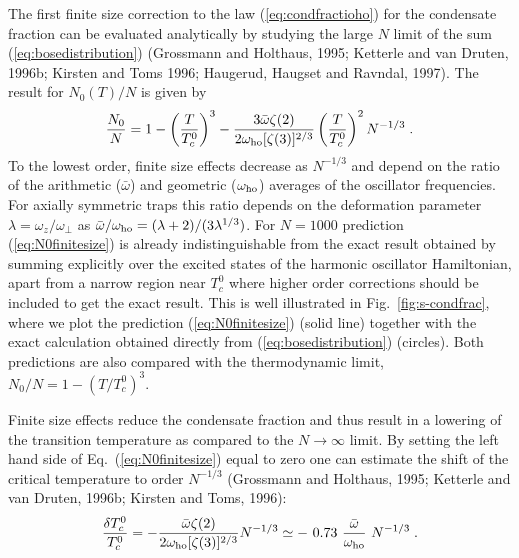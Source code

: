 The first finite size correction to the law (\ref{eq:condfractioho}) for
the condensate fraction can be evaluated analytically by studying the large
$N$ limit of the sum (\ref{eq:bosedistribution}) (Grossmann and Holthaus, 
1995; Ketterle and van Druten, 1996b; Kirsten and Toms 1996; Haugerud, 
Haugset and Ravndal, 1997). The result for $N_0(T)/N$ is given by
\begin{equation}
{ N_0 \over N } = 1 - \left( {T \over T_c^0} \right)^3
- { 3 \bar{\omega} \zeta(2) \over 2 \omega_{\rm ho}
[\zeta(3)]^{2/3} } \left( {T \over T_c^0} \right)^2 
N^{-1/3}  \;.
\label{eq:N0finitesize}
\end{equation}
To the lowest order, finite size effects decrease as $N^{-1/3}$ 
and depend on the ratio of the arithmetic ($\bar{\omega}$) and
geometric ($\omega_{\rm ho}$) averages of the oscillator frequencies.
For axially symmetric traps this ratio depends on the deformation parameter
$\lambda=\omega_z/\omega_\perp$ as $\bar{\omega}/\omega_{\rm ho}=(\lambda+2)/
(3\lambda^{1/3})$.  For $N=1000$ prediction (\ref{eq:N0finitesize})
is  already indistinguishable from the exact result obtained by summing
explicitly over the excited states of the  harmonic oscillator
Hamiltonian, apart from a narrow region near $T_c^0$ where higher
order corrections should be included  to get 
the exact result. This is well illustrated in Fig.~\ref{fig:s-condfrac},
where we plot the prediction (\ref{eq:N0finitesize}) (solid line)
together with the exact calculation obtained directly from 
(\ref{eq:bosedistribution}) (circles). Both predictions
are also compared with the thermodynamic limit, $N_0/N=1-(T/T_c^0)^3$.

Finite size effects reduce the condensate fraction and thus result in a
lowering of the transition temperature as compared to the $N\to\infty$
limit.   By setting the left hand
side of Eq.~(\ref{eq:N0finitesize}) equal to zero one can estimate the  
shift of the critical temperature to order $N^{-1/3}$ 
(Grossmann and Holthaus, 1995; Ketterle and van Druten, 1996b; 
Kirsten and Toms, 1996):
\begin{equation}
{ \delta T_c^0 \over T_c^0 } = - { \bar{\omega}  \zeta(2) \over
2 \omega_{\rm ho} [\zeta(3)]^{2/3} } N^{-1/3} \simeq
- \ 0.73 \  { \bar{\omega} \over \omega_{\rm ho} }
\ N^{-1/3} \; .
\label{eq:dtc}
\end{equation}

